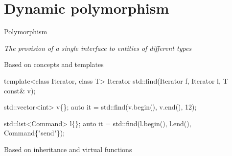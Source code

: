

\section*{Dynamic polymorphism}

\begin{frame}[fragile]{Polymorphism}

  \textit{The provision of a single interface to entities of different types}

  \begin{description}
  \item<2-> [static] Based on concepts and templates
    \begin{codeblock}
template<class Iterator, class T>
Iterator std::find(Iterator f, Iterator l, T const& v);

std::vector<int> v\{\ddd\};
auto it = std::find(v.begin(), v.end(), 12);

std::list<Command> l\{\ddd\};
auto it = std::find(l.begin(), l.end(), Command\{"send"\});\end{codeblock}
  \item<3-> [dynamic] Based on inheritance and virtual functions
  \end{description}
\end{frame}

